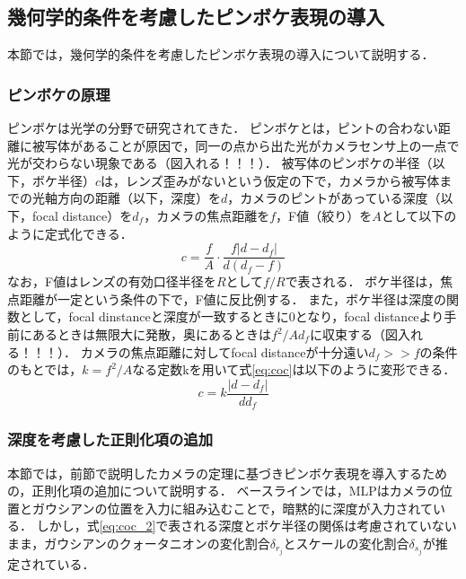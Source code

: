 \subsection{幾何学的条件を考慮したピンボケ表現の導入}\label{subsec:introduction_of_blur_expression}
本節では，幾何学的条件を考慮したピンボケ表現の導入について説明する．
\subsubsection{ピンボケの原理}\label{subsubsec:principle_of_blur}
ピンボケは光学の分野で研究されてきた\cite{optics}．
ピンボケとは，ピントの合わない距離に被写体があることが原因で，同一の点から出た光がカメラセンサ上の一点で光が交わらない現象である（図入れる！！！）．
被写体のピンボケの半径（以下，ボケ半径）$c$は，レンズ歪みがないという仮定の下で，カメラから被写体までの光軸方向の距離（以下，深度）を$d$，カメラのピントがあっている深度（以下，focal distance）を$d_f$，カメラの焦点距離を$f$，F値（絞り）を$A$として以下のように定式化できる．
\begin{equation}
	c = \frac{f}{A} \cdot \frac{f\left|d-d_f\right|}{d(d_f-f)}
	\label{eq:coc}
\end{equation}
なお，F値はレンズの有効口径半径を$R$として$f/R$で表される．
ボケ半径は，焦点距離が一定という条件の下で，F値に反比例する．
また，ボケ半径は深度の関数として，focal dinstanceと深度が一致するときに0となり，focal distanceより手前にあるときは無限大に発散，奥にあるときは$f^2/{Ad_f}$に収束する（図入れる！！！）．
カメラの焦点距離に対してfocal distanceが十分遠い$d_f>>f$の条件のもとでは，$k=f^2/A$なる定数kを用いて式\ref{eq:coc}は以下のように変形できる．
\begin{equation}
	c = k \frac{\left|d-d_f\right|}{dd_f}
	\label{eq:coc_2}
\end{equation}
\subsubsection{深度を考慮した正則化項の追加}\label{subsubsec:add_regularization_term}
本節では，前節で説明したカメラの定理に基づきピンボケ表現を導入するための，正則化項の追加について説明する．
ベースラインでは，MLPはカメラの位置とガウシアンの位置を入力に組み込むことで，暗黙的に深度が入力されている．
しかし，式\ref{eq:coc_2}で表される深度とボケ半径の関係は考慮されていないまま，ガウシアンのクォータニオンの変化割合$\delta_{r_j}$とスケールの変化割合$\delta_{s_j}$が推定されている．\par


